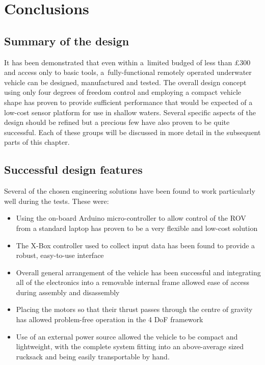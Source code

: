 \pagestyle{chapter-fancy-style}
\chapter{Conclusions}

\section{Summary of the design}

It has been demonstrated that even within a~limited budged of less than £300 and
access only to basic tools, a~fully-functional remotely operated underwater vehicle 
can be designed, manufactured and tested.
The overall design concept using only four degrees of freedom control and employing
a compact vehicle shape has proven to provide sufficient performance that would be
expected of a low-cost sensor platform for use in shallow waters.
Several specific aspects of the design should be refined but a precious
few have also proven to be quite successful. Each of these groups will be discussed
in more detail in the subsequent parts of this chapter.

\section{Successful design features}

Several of the chosen engineering solutions have been found to work particularly
well during the tests. These were:
%
\begin{itemize}
\item Using the on-board Arduino micro-controller to allow control of the ROV
	from a standard laptop has proven to be a very flexible and low-cost solution
\item The X-Box controller used to collect input data has been found to provide
	a robust, easy-to-use interface
\item Overall general arrangement of the vehicle has been successful and integrating
	all of the electronics into a removable internal frame allowed ease of access
	during assembly and disassembly
\item Placing the motors so that their thrust passes through the centre of gravity
	has allowed problem-free operation in the 4 DoF framework
\item Use of an external power source allowed the vehicle to be compact and
	lightweight, with the complete system fitting into an above-average sized
	rucksack and being easily transportable by hand.
\end{itemize}

